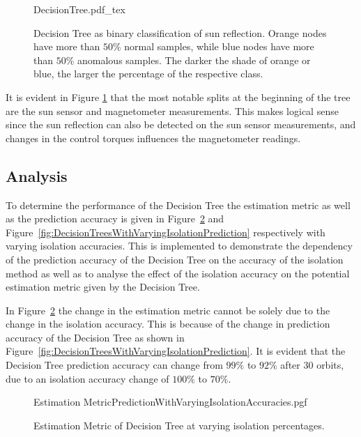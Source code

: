 \begin{figure}[!hbt]
	\centering
	\def\svgwidth{16cm}
	{DecisionTree.pdf_tex}
	\caption{Decision Tree as binary classification of sun reflection. Orange nodes have more than $50\%$ normal samples, while blue nodes have more than $50\%$ anomalous samples. The darker the shade of orange or blue, the larger the percentage of the respective class.}
	\label{fig:DecisionTree}
\end{figure}

It is evident in Figure \ref{fig:DecisionTree} that the most notable splits at the beginning of the tree are the sun sensor and magnetometer measurements. This makes logical sense since the sun reflection can also be detected on the sun sensor measurements, and changes in the control torques influences the magnetometer readings.

\subsection{Analysis}
To determine the performance of the Decision Tree the estimation metric as well as the prediction accuracy is given in Figure~\ref{fig:DecisionTreesWithVaryingIsolationEstimation} and Figure~\ref{fig:DecisionTreesWithVaryingIsolationPrediction} respectively with varying isolation accuracies. This is implemented to demonstrate the dependency of the prediction accuracy of the Decision Tree on the accuracy of the isolation method as well as to analyse the effect of the isolation accuracy on the potential estimation metric given by the Decision Tree.

In Figure~\ref{fig:DecisionTreesWithVaryingIsolationEstimation} the change in the estimation metric cannot be solely due to the change in the isolation accuracy. This is because of the change in prediction accuracy of the Decision Tree as shown in Figure~\ref{fig:DecisionTreesWithVaryingIsolationPrediction}. It is evident that the Decision Tree prediction accuracy can change from $99\%$ to $92\%$ after $30$ orbits, due to an isolation accuracy change of $100\%$ to $70\%$.
\begin{figure}[!htb]
	\centering
	{Estimation MetricPredictionWithVaryingIsolationAccuracies.pgf}
	
	\caption{Estimation Metric of Decision Tree at varying isolation percentages.}
	\label{fig:DecisionTreesWithVaryingIsolationEstimation}
\end{figure}

